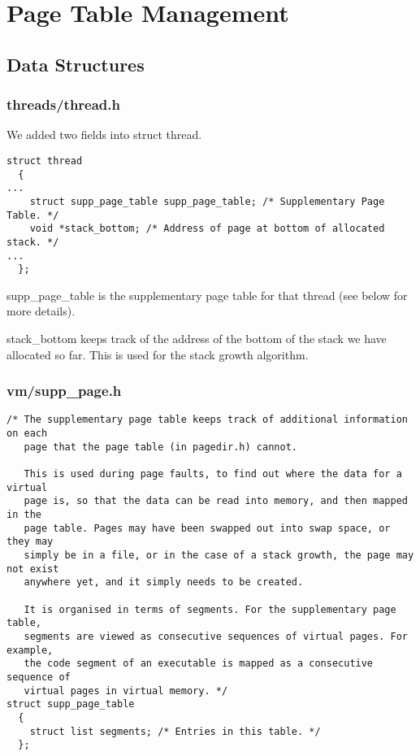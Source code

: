 \section{Page Table Management}

\subsection{Data Structures}


\subsubsection*{threads/thread.h}

We added two fields into struct thread.

\begin{verbatim}
struct thread
  {
...
    struct supp_page_table supp_page_table; /* Supplementary Page Table. */
    void *stack_bottom; /* Address of page at bottom of allocated stack. */
...
  };
\end{verbatim}

supp\_page\_table is the supplementary page table for that thread (see below for
more details).

stack\_bottom keeps track of the address of the bottom of the stack we have
allocated so far. This is used for the stack growth algorithm.

\subsubsection*{vm/supp\_page.h}

\begin{verbatim}
/* The supplementary page table keeps track of additional information on each
   page that the page table (in pagedir.h) cannot.

   This is used during page faults, to find out where the data for a virtual
   page is, so that the data can be read into memory, and then mapped in the
   page table. Pages may have been swapped out into swap space, or they may
   simply be in a file, or in the case of a stack growth, the page may not exist
   anywhere yet, and it simply needs to be created.

   It is organised in terms of segments. For the supplementary page table,
   segments are viewed as consecutive sequences of virtual pages. For example,
   the code segment of an executable is mapped as a consecutive sequence of
   virtual pages in virtual memory. */
struct supp_page_table
  {
    struct list segments; /* Entries in this table. */
  };
\end{verbatim}

